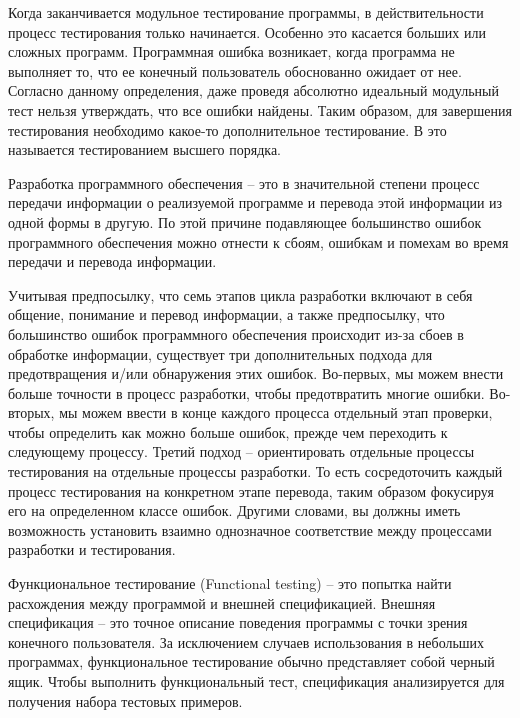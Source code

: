 Когда заканчивается модульное тестирование программы, в действительности процесс тестирования 
только начинается. Особенно это касается больших или сложных программ. Программная ошибка возникает, когда программа не выполняет то, что ее конечный пользователь обоснованно ожидает от 
нее. Согласно данному определения, даже проведя абсолютно идеальный модульный тест нельзя 
утверждать, что все ошибки найдены. Таким образом, для завершения тестирования необходимо какое-то 
дополнительное тестирование. В\cite{Myers2004} это называется тестированием высшего порядка.

Разработка программного обеспечения -- это в значительной степени процесс передачи информации о 
реализуемой программе и перевода этой информации из одной формы в другую. По этой причине 
подавляющее большинство ошибок программного обеспечения можно отнести к сбоям, ошибкам и 
помехам во время передачи и перевода информации.

Учитывая предпосылку, что семь этапов цикла разработки включают в себя общение, понимание и 
перевод информации, а также предпосылку, что большинство ошибок программного обеспечения 
происходит из-за сбоев в обработке информации, существует три дополнительных подхода для 
предотвращения и/или обнаружения этих ошибок. Во-первых, мы можем внести больше точности в 
процесс разработки, чтобы предотвратить многие ошибки. Во-вторых, мы можем ввести в конце 
каждого процесса отдельный этап проверки, чтобы определить как можно больше ошибок, прежде чем 
переходить к следующему процессу. Третий подход -- ориентировать отдельные процессы 
тестирования на отдельные процессы разработки. То есть сосредоточить каждый процесс 
тестирования на конкретном этапе перевода, таким образом фокусируя его на определенном классе ошибок. %
Другими словами, вы должны иметь возможность установить взаимно однозначное соответствие между процессами разработки и тестирования.

Функциональное тестирование (Functional testing) -- это попытка найти расхождения между 
программой и внешней спецификацией. Внешняя спецификация -- это точное описание поведения 
программы с точки зрения конечного пользователя. За исключением случаев использования в 
небольших программах, функциональное тестирование обычно представляет собой черный ящик.
Чтобы выполнить функциональный тест, спецификация анализируется для получения набора тестовых 
примеров.

